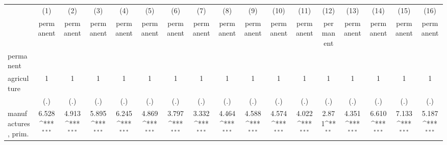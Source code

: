 {
\def\sym#1{\ifmmode^{#1}\else\(^{#1}\)\fi}
\begin{tabular}{l*{16}{c}}
\hline\hline
                    &\multicolumn{1}{c}{(1)}&\multicolumn{1}{c}{(2)}&\multicolumn{1}{c}{(3)}&\multicolumn{1}{c}{(4)}&\multicolumn{1}{c}{(5)}&\multicolumn{1}{c}{(6)}&\multicolumn{1}{c}{(7)}&\multicolumn{1}{c}{(8)}&\multicolumn{1}{c}{(9)}&\multicolumn{1}{c}{(10)}&\multicolumn{1}{c}{(11)}&\multicolumn{1}{c}{(12)}&\multicolumn{1}{c}{(13)}&\multicolumn{1}{c}{(14)}&\multicolumn{1}{c}{(15)}&\multicolumn{1}{c}{(16)}\\
                    &\multicolumn{1}{c}{permanent}&\multicolumn{1}{c}{permanent}&\multicolumn{1}{c}{permanent}&\multicolumn{1}{c}{permanent}&\multicolumn{1}{c}{permanent}&\multicolumn{1}{c}{permanent}&\multicolumn{1}{c}{permanent}&\multicolumn{1}{c}{permanent}&\multicolumn{1}{c}{permanent}&\multicolumn{1}{c}{permanent}&\multicolumn{1}{c}{permanent}&\multicolumn{1}{c}{permanent}&\multicolumn{1}{c}{permanent}&\multicolumn{1}{c}{permanent}&\multicolumn{1}{c}{permanent}&\multicolumn{1}{c}{permanent}\\
\hline
permanent           &                     &                     &                     &                     &                     &                     &                     &                     &                     &                     &                     &                     &                     &                     &                     &                     \\
agriculture         &           1         &           1         &           1         &           1         &           1         &           1         &           1         &           1         &           1         &           1         &           1         &           1         &           1         &           1         &           1         &           1         \\
                    &         (.)         &         (.)         &         (.)         &         (.)         &         (.)         &         (.)         &         (.)         &         (.)         &         (.)         &         (.)         &         (.)         &         (.)         &         (.)         &         (.)         &         (.)         &         (.)         \\
[1em]
manufactures, prim. &       6.528\sym{***}&       4.913\sym{***}&       5.895\sym{***}&       6.245\sym{***}&       4.869\sym{***}&       3.797\sym{***}&       3.332\sym{***}&       4.464\sym{***}&       4.588\sym{***}&       4.574\sym{***}&       4.022\sym{***}&       2.871\sym{**} &       4.351\sym{***}&       6.610\sym{***}&       7.133\sym{***}&       5.187\sym{***}\\

\end{tabular}}
